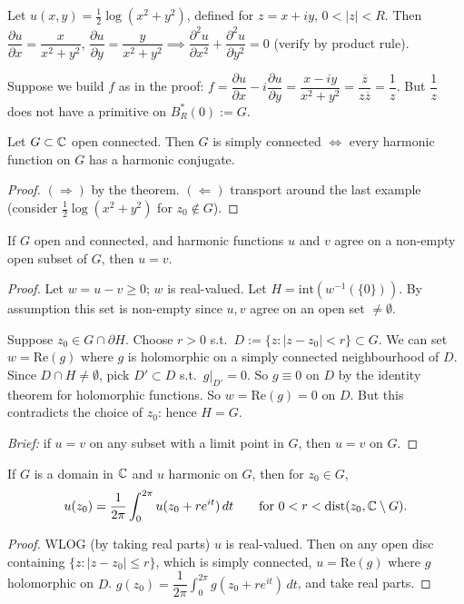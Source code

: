 \documentclass[11pt]{article}
\begin{document}
\begin{example}
Let $u(x,y) = \frac12\log(x^2+y^2)$, defined for $z=x+iy$, $0<|z|<R$. Then $\dfrac{\partial u}{\partial x} = \dfrac{x}{x^2+y^2}$, $\dfrac{\partial u}{\partial y} = \dfrac{y}{x^2+y^2} \implies \dfrac{\partial^2 u}{\partial x^2}+\dfrac{\partial^2u}{\partial y^2}=0$ (verify by product rule).

Suppose we build $f$ as in the proof: $f = \dfrac{\partial u}{\partial x} - i\dfrac{\partial u}{\partial y} = \dfrac{x-iy}{x^2+y^2} = \dfrac{\overline z}{z\overline z} = \dfrac1z$. But $\dfrac1z$ does not have a primitive on $B_R^*(0) := G$.
\end{example}

\begin{corollary}
Let $G\subset{\mathbb{C}}$ open connected. Then $G$ is simply connected $\iff$ every harmonic function on $G$ has a harmonic conjugate.
\end{corollary}
\begin{proof}
$(\Rightarrow)$ by the theorem.
$(\Leftarrow)$ transport around the last example (consider $\frac12\log(x^2+y^2)$ for $z_0\notin G$).
\end{proof}

\begin{corollary}
If $G$ open and connected, and harmonic functions $u$ and $v$ agree on a non-empty open subset of $G$, then $u=v$.
\end{corollary}

\begin{proof}
Let $w=u-v \ge 0$; $w$ is real-valued. Let $H = \mathrm{int}(w^{-1}(\{0\}))$. By assumption this set is non-empty since $u,v$ agree on an open set $\ne\emptyset$.

Suppose $z_0\in G\cap\partial H$. Choose $r>0$ s.t.\ $D:=\{z : |z-z_0|<r\}\subset G$. We can set $w=\mathrm{Re}(g)$ where $g$ is holomorphic on a simply connected neighbourhood of $D$.
Since $D\cap H\ne\emptyset$, pick $D'\subset D$ s.t.\ $g|_{D'}=0$. So $g\equiv0$ on $D$ by the identity theorem for holomorphic functions. So $w=\mathrm{Re}(g)=0$ on $D$. But this contradicts the choice of $z_0$: hence $H=G$.

\emph{Brief:} if $u=v$ on any subset with a limit point in $G$, then $u=v$ on $G$.
\end{proof}

\begin{corollary}
If $G$ is a domain in ${\mathbb{C}}$ and $u$ harmonic on $G$, then for $z_0\in G$,
\[
u(z_0) = \frac{1}{2\pi}\int_0^{2\pi} u(z_0+re^{it})\,dt \qquad \text{for } 0<r<\mathrm{dist}(z_0,{\mathbb{C}}\setminus G).
\]
\end{corollary}
\begin{proof}
WLOG (by taking real parts) $u$ is real-valued. Then on any open disc containing $\{z:|z-z_0|\le r\}$, which is simply connected, $u=\mathrm{Re}(g)$ where $g$ holomorphic on $D$. $g(z_0) = \dfrac{1}{2\pi}\int_0^{2\pi} g(z_0+re^{it})\,dt$, and take real parts.
\end{proof}
\end{document}
